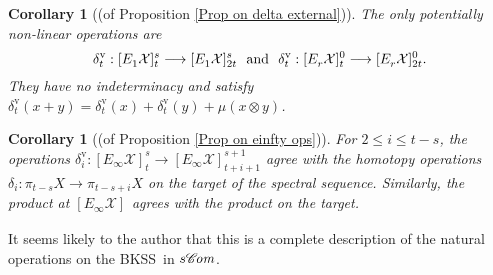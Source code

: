 \documentclass[11pt]{amsart} \renewcommand{\baselinestretch}{1.2}
\theoremstyle{plain}
\newtheorem{cor}[thm]{Corollary}
\numberwithin{equation}{section} %
\theoremstyle{plain}
\newtheorem{cor}[thm]{Corollary}
\numberwithin{equation}{chapter} %
\renewcommand{\to}{\longrightarrow}
\newcommand{\scrC}{\mathscr{C}}
\newcommand{\calx}{\mathcal{X}}
\newcommand{\algs}{{\scrC\!\textit{\normalfont\textit{om}}}}
\newcommand{\E}[5]{[E^{#1}_{#2}#3]^{#4}_{#5}}
\newcommand{\uver}{^\mathrm{v}}
\newcommand{\dhor}{_\mathrm{h}}
\newcommand{\Sqh}{\mathrm{Sq}\dhor}
\newcommand{\deltav}{\delta\uver}
\newcommand{\BKSS}{BKSS}
\begin{document}
\begin{Operations on the Bousfield-Kan spectral sequence}
\begin{cor}[(of Proposition \ref{Prop on delta external})]
The only potentially non-linear  operations are
\[
\deltav_t: \E{}{1}{\calx}{s}{t}\to  \E{}{1}{\calx}{s}{2t}\textup{ \ and \ } \deltav_t: \E{}{r}{\calx}{0}{t}\to  \E{}{r}{\calx}{0}{2t}.
\]
They  have no indeterminacy and satisfy $\deltav_t(x+y)=\deltav_t(x)+\deltav_t(y)+\mu(x\otimes y)$.
%
%
%
%
%
%
%
%
%
\end{cor}


\begin{cor}[(of Proposition \ref{Prop on einfty ops})]
\label{Prop on einfty ops composed with lift}
For $2\leq i\leq t-s$, the operations $\deltav_i:\E{}{\infty}{\calx}{s}{t}\to \E{}{\infty}{\calx}{s+1}{t+i+1}$ agree with the homotopy operations $\delta_i:\pi_{t-s}X\to \pi_{t-s+i}X$ on the target of the spectral sequence. Similarly, the product at $\E{}{\infty}{\calx}{}{}$ agrees with the product on the target.
\end{cor}

It seems likely to the author that this is a complete description of the natural operations on the \BKSS\ in $s\algs$.




\end{Operations on the Bousfield-Kan spectral sequence}
\end{document}
